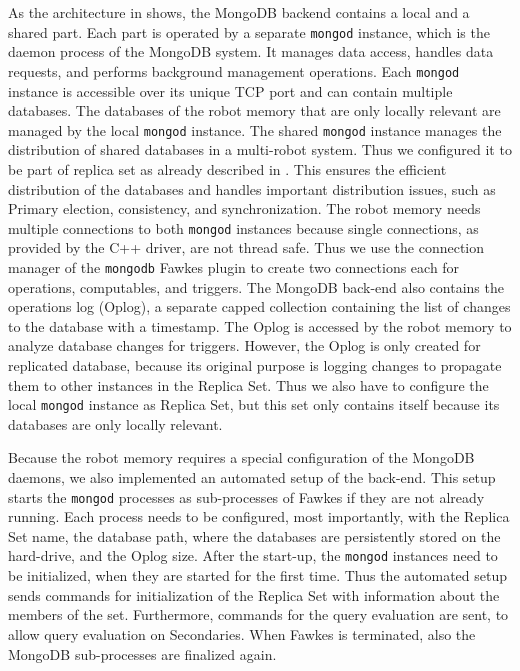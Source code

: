 As the architecture in  shows, the MongoDB backend
contains a local and a shared part. Each part is operated by a
separate \texttt{mongod} instance, which is the daemon process of the
MongoDB system. It manages data access, handles data requests, and
performs background management operations. Each \texttt{mongod}
instance is accessible over its unique TCP port and can contain multiple
databases. The databases of the robot memory that are only locally
relevant are managed by the local \texttt{mongod} instance. The shared
\texttt{mongod} instance manages the distribution of shared databases
in a multi-robot system. Thus we configured it to be part of replica
set as already described in . This ensures the
efficient distribution of the databases and handles important
distribution issues, such as Primary election, consistency, and
synchronization.    The
robot memory needs multiple connections to both \texttt{mongod}
instances because single connections, as provided by the C++ driver,
are not thread safe. Thus we use the connection manager of the
\texttt{mongodb} Fawkes plugin to create two connections each for
operations, computables, and triggers.
%
The MongoDB back-end also contains the operations log (Oplog), a
separate capped collection containing the list of changes to the
database with a timestamp. The Oplog is accessed by the robot memory
to analyze database changes for triggers. However, the Oplog is only
created for replicated database, because its original purpose is
logging changes to propagate them to other instances in the Replica
Set. Thus we also have to configure the local \texttt{mongod} instance
as Replica Set, but this set only contains itself because its
databases are only locally relevant.

Because the robot memory requires a special configuration of the
MongoDB daemons, we also implemented an automated setup of the
back-end. This setup starts the \texttt{mongod} processes as
sub-processes of Fawkes if they are not already running. Each process
needs to be configured, most importantly, with the Replica Set name,
the database path, where the databases are persistently stored on the
hard-drive, and the Oplog size. After the start-up, the \texttt{mongod}
instances need to be initialized, when they are started for the first
time. Thus the automated setup sends commands for initialization of
the Replica Set with information about the members of the
set. Furthermore, commands for the query evaluation are sent, to allow
query evaluation on Secondaries. When Fawkes is terminated, also the
MongoDB sub-processes are finalized again.

